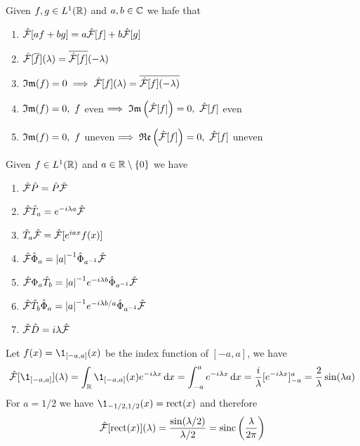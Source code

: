 \documentclass[../complete.tex]{subfiles}
\begin{document}
\begin{thm}
	Given $f,g\in L^1(\mathbb{R})$ and $a,b\in\mathbb{C}$ we hafe that
	\begin{enumerate}
	\item $\hat{\mathcal{F}}[af+bg]=a\hat{\mathcal{F}}[f]+b\hat{\mathcal{F}}[g]$
	\item $\hat{\mathcal{F}}[\overline{f}](\lambda)=\overline{\hat{\mathcal{F}}[f]}(-\lambda)$
	\item $\mathfrak{Im}(f)=0\implies{}\hat{\mathcal{F}}[f](\lambda)=\overline{\hat{\mathcal{F}}[f](-\lambda)}$
	\item $\mathfrak{Im}(f)=0,\ f$ even$\implies{}\imaginary\left( \fou[f] \right)=0,\ \fou[f]$ even
	\item $\mathfrak{Im}(f)=0,\ f$ uneven$\implies{}\real\left(\fou[f]\right)=0,\ \fou[f]$ uneven
	\end{enumerate}
\end{thm}
\begin{thm}
	Given $f\in L^1(\mathbb{R})$ and $a\in\mathbb{R}\setminus\{0\}$ we have
	\begin{enumerate}
	\item $\hat{\mathcal{F}}\hat{P}=\hat{P}\hat{\mathcal{F}}$
	\item $\hat{\mathcal{F}}\hat{T}_a=e^{-i\lambda a}\hat{\mathcal{F}}$
	\item $\hat{T}_a\hat{\mathcal{F}}=\hat{\mathcal{F}}[e^{iax}f(x)]$
	\item $\hat{\mathcal{F}}\hat{\Phi}_a=\abs{a}^{-1}\hat{\Phi}_{a^{-1}}\hat{\mathcal{F}}$
	\item $\hat{\mathcal{F}}\Phi_a\hat{T}_b=\abs{a}^{-1}e^{-i\lambda b}\hat{\Phi}_{a^{-1}}\hat{\mathcal{F}}$
	\item $\hat{\mathcal{F}}\hat{T}_b\hat{\Phi}_a=\abs{a}^{-1}e^{-i\lambda b/a}\hat{\Phi}_{a^{-1}}\hat{\mathcal{F}}$
	\item $\hat{\mathcal{F}}\hat{D}=i\lambda\hat{\mathcal{F}}$
	\end{enumerate}
\end{thm}
\begin{eg}
	Let $f(x)=\1_{[-a,a]}(x)$ be the index function of $[-a,a]$, we have
	\begin{equation*}
		\fou[\1_{[-a,a]}](\lambda)=\int_{\R}^{}\1_{[-a,a]}(x)e^{-i\lambda x}\diff x=\int_{-a}^{a}e^{-i\lambda x}\diff x=\frac{i}{\lambda}[e^{-i\lambda x}]_{-a}^a=\frac{2}{\lambda}\sin(\lambda a)
	\end{equation*}
	For $a=1/2$ we have $\1_{-1/2,1/2}(x)=\mathrm{rect}(x)$ and therefore
	\begin{equation*}
		\hat{\mathcal{F}}[\mathrm{rect}(x)](\lambda)=\frac{\sin(\lambda/2)}{\lambda/2}=\mathrm{sinc}\left( \frac{\lambda}{2\pi} \right)
	\end{equation*}
\end{eg}
\end{document}
